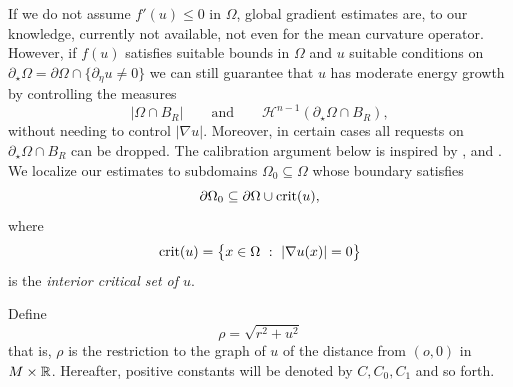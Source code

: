 \documentclass[10 pt,a4paper]{article}
\theoremstyle{definition}
\begin{document}
If we do not assume $f'(u) \le 0$ in $\Omega$, global gradient estimates are, to our knowledge, currently not available, not even for the mean curvature operator. However, if $f(u)$ satisfies suitable bounds in $\Omega$ and $u$ suitable conditions on $\partial_\star \Omega = \partial\Omega \cap \{\partial_\eta u \neq 0\}$ we can still guarantee that $u$ has moderate energy growth by controlling the measures 
\[
|\Omega \cap B_R| \qquad \text{and} \qquad \mathscr{H}^{n-1}(\partial_\star \Omega \cap B_R),
\]
without needing to control $|\nabla u|$. Moreover, in certain cases all requests on $\partial_\star \Omega \cap B_R$ can be dropped. The calibration argument below is inspired by \cite[p. 403]{gilbargtrudinger}, \cite[p. 24]{simon} and \cite{FSV}. We localize our estimates to subdomains $\Omega_0 \subseteq \Omega$ whose boundary satisfies
\[
\partial \Omega_0 \subseteq \partial \Omega \cup {\rm crit}(u),
\]
where
\[
{\rm crit}(u) = \big\{ x \in \Omega \ : \ |\nabla u(x)| = 0 \big\}
\]
is the \emph{interior critical set of $u$}. 

Define
\[
	\rho = \sqrt{ r^2 + u^2}
\]
that is, $\rho$ is the restriction to the graph of $u$ of the distance from $(o,0)$ in $M \times \mathbb R$. Hereafter, positive constants will be denoted by $C,C_0,C_1$ and so forth.
\end{document}
